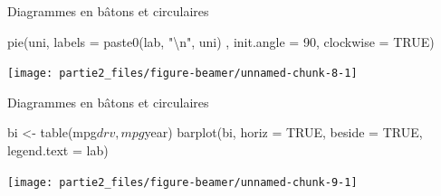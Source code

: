 \documentclass[12pt,ignorenonframetext,]{beamer}
\newenvironment{Shaded}{}{}
\newcommand{\CharTok}[1]{\textcolor[rgb]{0.00,0.50,0.50}{#1}}
\newcommand{\DataTypeTok}[1]{#1}
\newcommand{\DecValTok}[1]{#1}
\newcommand{\KeywordTok}[1]{\textcolor[rgb]{0.00,0.00,1.00}{#1}}
\newcommand{\NormalTok}[1]{#1}
\newcommand{\OperatorTok}[1]{#1}
\newcommand{\OtherTok}[1]{\textcolor[rgb]{1.00,0.25,0.00}{#1}}
\newcommand{\StringTok}[1]{\textcolor[rgb]{0.00,0.50,0.50}{#1}}
\renewenvironment{Shaded}{\begin{snugshade}}{\end{snugshade}}
\begin{document}
\begin{frame}[fragile]{Diagrammes en bâtons et circulaires}
\protect\hypertarget{diagrammes-en-batons-et-circulaires-2}{}

\centering \footnotesize

\begin{Shaded}
\begin{Highlighting}[]
\KeywordTok{pie}\NormalTok{(uni, }\DataTypeTok{labels =} \KeywordTok{paste0}\NormalTok{(lab, }\StringTok{"}\CharTok{\textbackslash{}n}\StringTok{"}\NormalTok{, uni)}
\NormalTok{    , }\DataTypeTok{init.angle =} \DecValTok{90}\NormalTok{, }\DataTypeTok{clockwise =} \OtherTok{TRUE}\NormalTok{)}
\end{Highlighting}
\end{Shaded}

\texttt{[image: partie2\_files/figure-beamer/unnamed-chunk-8-1]}

\end{frame}

\begin{frame}[fragile]{Diagrammes en bâtons et circulaires}
\protect\hypertarget{diagrammes-en-batons-et-circulaires-3}{}

\centering \footnotesize

\begin{Shaded}
\begin{Highlighting}[]
\NormalTok{bi <-}\StringTok{ }\KeywordTok{table}\NormalTok{(mpg}\OperatorTok{$}\NormalTok{drv, mpg}\OperatorTok{$}\NormalTok{year)}
\KeywordTok{barplot}\NormalTok{(bi, }\DataTypeTok{horiz =} \OtherTok{TRUE}\NormalTok{, }\DataTypeTok{beside =} \OtherTok{TRUE}\NormalTok{, }\DataTypeTok{legend.text =}\NormalTok{ lab)}
\end{Highlighting}
\end{Shaded}

\texttt{[image: partie2\_files/figure-beamer/unnamed-chunk-9-1]}

\end{frame}
\end{document}
